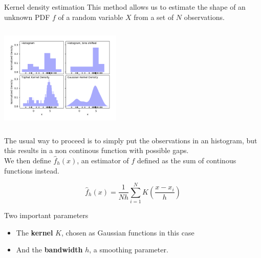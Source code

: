 \documentclass[8 pt]{beamer}
\begin{document}
\begin{frame}{Kernel density estimation}
This method allows us to estimate the shape of an unknown PDF $f$ of a random variable $X$ from a set of $N$ observations.

\begin{minipage}[c]{.50\textwidth}
\includegraphics[width=5.8cm, height=5cm]{figs/kernels.png}
\end{minipage}
\begin{minipage}[c]{.50\textwidth}
\justifying
The usual way to proceed is to simply put the observations in an histogram, but this results in a non continous function with possible gaps. \\ \vspace{10pt}
We then define $\hat{f}_h(x)$, an estimator of $f$ defined as the sum of continous functions instead.

\begin{equation*}
\label{eq:KDF}
\hat{f}_h(x) = \frac{1}{Nh} \sum_{i=1}^{N} K \left (\frac{x-x_i}{h} \right )
\end{equation*}
\end{minipage}

Two important parameters
\begin{itemize}
\item The \textbf{\alert{kernel}} $K$, chosen as Gaussian functions in this case
\item And the \textbf{\alert{bandwidth}} $h$, a smoothing parameter.
\end{itemize} \vfill

\end{frame}
\end{document}
